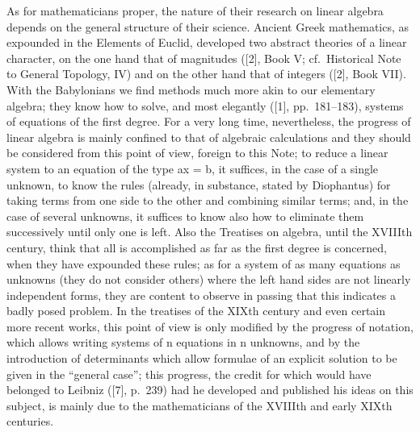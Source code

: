 As for mathematicians proper, the nature of their research on linear algebra depends on the general structure of their science. Ancient Greek mathematics, as expounded in the Elements of Euclid, developed two abstract theories of a linear character, on the one hand that of magnitudes ({[}2{]}, Book V; cf.~Historical Note to General Topology, IV) and on the other hand that of integers ({[}2{]}, Book VII). With the Babylonians we find methods much more akin to our elementary algebra; they know how to solve, and most elegantly ({[}1{]}, pp.~181--183), systems of equations of the first degree. For a very long time, nevertheless, the progress of linear algebra is mainly confined to that of algebraic calculations and they should be considered from this point of view, foreign to this Note; to reduce a linear system to an equation of the type ax = b, it suffices, in the case of a single unknown, to know the rules (already, in substance, stated by Diophantus) for taking terms from one side to the other and combining similar terms; and, in the case of several unknowns, it suffices to know also how to eliminate them successively until only one is left. Also the Treatises on algebra, until the XVIIIth century, think that all is accomplished as far as the first degree is concerned, when they have expounded these rules; as for a system of as many equations as unknowns (they do not consider others) where the left hand sides are not linearly independent forms, they are content to observe in passing that this indicates a badly posed problem. In the treatises of the XIXth century and even certain more recent works, this point of view is only modified by the progress of notation, which allows writing systems of n equations in n unknowns, and by the introduction of determinants which allow formulae of an explicit solution to be given in the ``general case''; this progress, the credit for which would have belonged to Leibniz ({[}7{]}, p.~239) had he developed and published his ideas on this subject, is mainly due to the mathematicians of the XVIIIth and early XIXth centuries.

